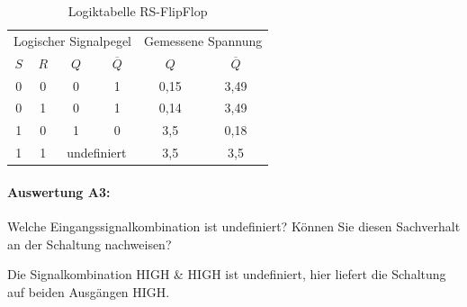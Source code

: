 \documentclass[a4paper,titlepage,parskip]{scrreprt}
\begin{document}
          \begin{center}
              \begin{table}[!hbtp]
                  \caption{Logiktabelle RS-FlipFlop}
                  \renewcommand{\arraystretch}{1.3}
                  \begin{center}
                      \begin{tabular}{cc|cc|cc}
                          \multicolumn{4}{c|}{Logischer Signalpegel} &\multicolumn{2}{c}{Gemessene Spannung}\\
                          $S$ & $R$ & $Q$ & $\overline{Q}$ & $Q$ & $\overline{Q}$\\ \hline
                          0 & 0 & 0 & 1 & 0,15 & 3,49\\
                          0 & 1 & 0 & 1 & 0,14 & 3,49\\
                          1 & 0 & 1 & 0 & 3,5 & 0,18\\
                          1 & 1 & \multicolumn{2}{c|}{undefiniert} & 3,5 & 3,5
                      \end{tabular}
                  \end{center}
              \end{table}
          \end{center}
        \paragraph{Auswertung A3:} Welche Eingangssignalkombination ist undefiniert? Können Sie diesen Sachverhalt an
          der Schaltung nachweisen?

          Die Signalkombination HIGH \& HIGH ist undefiniert, hier liefert die Schaltung auf beiden Ausgängen HIGH.
\end{document}
